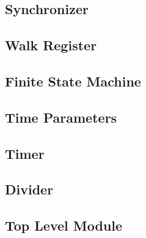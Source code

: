 \documentclass{article}
\begin{document}
	\subsection{Synchronizer}
		\begin{lgrind}
		
		\end{lgrind}

	\subsection{Walk Register}
		\begin{lgrind}
		
		\end{lgrind}

	\subsection{Finite State Machine}
		\begin{lgrind}
		
		\end{lgrind}

	\subsection{Time Parameters}
		\begin{lgrind}
		
		\end{lgrind}

	\subsection{Timer}
		\begin{lgrind}
		
		\end{lgrind}

	\subsection{Divider}
		\begin{lgrind}
		
		\end{lgrind}

	\subsection{Top Level Module}
		\begin{lgrind}
		
		\end{lgrind}
\end{document}

